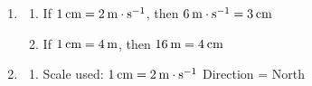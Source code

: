 {\begin{mdframed}[linewidth=4, leftmargin=40, rightmargin=40]
\begin{exercise}
\begin{enumerate}[noitemsep, label=\textbf{Step} \textbf{\arabic*}. ]
      \item  
      \label{m38812*id187925}\begin{enumerate}[noitemsep, label=\textbf{\alph*}. ] 
            \leftskip=20pt\rightskip=\leftskip\label{m38812*uid26}\item If \begin{math}1\phantom{\rule{2pt}{0ex}}\mathrm{cm}=2\phantom{\rule{2pt}{0ex}}\mathrm{m}\ensuremath{\cdot}{\mathrm{s}}^{-1}\end{math}, then \begin{math}6\phantom{\rule{2pt}{0ex}}\mathrm{m}\ensuremath{\cdot}{\mathrm{s}}^{-1}=3\phantom{\rule{2pt}{0ex}}\mathrm{cm}\end{math}
\label{m38812*uid27}\item If \begin{math}1\phantom{\rule{2pt}{0ex}}\mathrm{cm}=4\phantom{\rule{2pt}{0ex}}\mathrm{m}\end{math}, then \begin{math}16\phantom{\rule{2pt}{0ex}}\mathrm{m}=4\phantom{\rule{2pt}{0ex}}\mathrm{cm}\end{math}
\end{enumerate}
        
      \item  
      \label{m38812*id188000}\begin{enumerate}[noitemsep, label=\textbf{\alph*}. ] 
            \leftskip=20pt\rightskip=\leftskip\label{m38812*uid28}\item 
Scale used: \begin{math}1\phantom{\rule{2pt}{0ex}}\mathrm{cm}=2\phantom{\rule{2pt}{0ex}}\mathrm{m}\ensuremath{\cdot}{\mathrm{s}}^{-1}\end{math}
Direction = North

    \setcounter{subfigure}{0}



\end{enumerate}
\end{enumerate}
\end{exercise}
\end{mdframed}}
